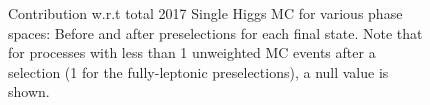 \begin{figure}[H]
	\caption{Contribution w.r.t total 2017 Single Higgs MC for various phase spaces: Before and after preselections for each final state. Note that for processes with less than 1 unweighted MC events after a selection (1 for the fully-leptonic preselections), a null value is shown.}
	\label{fig:Single_Higgs_Contribution_Table} 
\end{figure}
